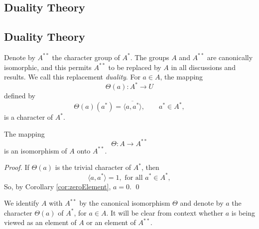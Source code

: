 {\subsection{Duality Theory}}
{\subsection{Duality Theory\protect\footnotemark}
}
Denote by $A^{**}$ the character group of $A^*$.  The groups $A$ and
$A^{**}$ are canonically isomorphic, and this permits $A^{**}$ to be
replaced by $A$ in all discussions and results.  We call this replacement
\emph{duality}. 
For $a\in A$, the mapping 
\[
\varTheta(a): A^* \to U
\]
defined by 
\[
\varTheta(a)(a^*) = \overline{\langle a, a^* \rangle}, \qquad a^* \in A^*,
\]
is a character of $A^*$.
\begin{theorem}
The mapping 
\[
\varTheta: A \to A^{**}
\] 
is an isomorphism of $A$ onto $A^{**}$.
\end{theorem}
\begin{proof} If $\varTheta(a)$ is the trivial character of $A^*$, then
\[
\langle a, a^* \rangle = 1, \text{  for all } a^* \in A^*,
\]
So, by Corollary \ref{cor:zeroElement}, $a = 0$. \qed
\end{proof}

We identify $A$ with $A^{**}$ by the canonical isomorphism $\varTheta$ and denote
by $a$ the character $\varTheta(a)$ of $A^*$, for $a\in A$.  It will be clear
from context whether $a$ is being viewed as an element of $A$ or an element of
$A^{**}$.

